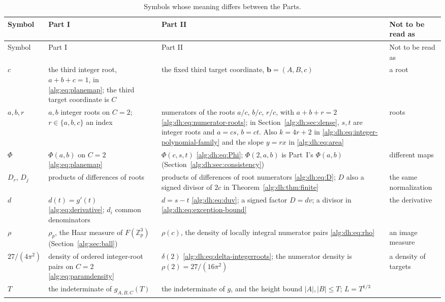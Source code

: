 \documentclass[11pt]{article}
\numberwithin{equation}{section}
\theoremstyle{plain}
\theoremstyle{plain}
\theoremstyle{plain}
\theoremstyle{definition}
\theoremstyle{definition}
\theoremstyle{definition}
\theoremstyle{remark}
\newcommand{\Z}{\mathbb Z}\newcommand{\Q}{\mathbb Q}
\newcommand{\target}{\boldsymbol b}
\begin{document}
\begingroup\small
\setlength{\tabcolsep}{4pt}
\begin{longtable}{@{}>{\raggedright}p{}>{\raggedright}p{}>{\raggedright}p{}>{\raggedright\arraybackslash}p{}@{}}
\caption{Symbols whose meaning differs between the Parts.}
\label{alg:dh:tab:notation}\\
\toprule
Symbol & Part I & Part II & Not to be read as\\
\midrule
\endfirsthead
\toprule
Symbol & Part I & Part II & Not to be read as\\
\midrule
\endhead
\bottomrule
\endfoot
$c$ & the third integer root, $a+b+c=1$, in \eqref{alg:eq:planemap}; the
third target coordinate is $C$ & the fixed third target coordinate,
$\target=(A,B,c)$ & a root\\
$a,b,r$ & $a,b$ integer roots on $C=2$; $r\in\{a,b,c\}$ an index &
numerators of the roots $a/c$, $b/c$, $r/c$, with $a+b+r=2$
\eqref{alg:dh:eq:numerator-roots}; in Section~\ref{alg:dh:sec:dense},
$s,t$ are integer roots and $a=cs$, $b=ct$. Also $k=4r+2$ in
\eqref{alg:dh:eq:integer-polynomial-family} and the slope $y=rx$ in
\eqref{alg:dh:eq:area} & roots\\
$\Phi$ & $\Phi(a,b)$ on $C=2$ \eqref{alg:eq:planemap} & $\Phi(c,s,t)$
\eqref{alg:dh:eq:Phi}; $\Phi(2,a,b)$ is Part~I's $\Phi(a,b)$
(Section~\ref{alg:dh:sec:consistency}) & different maps\\
$D_r$, $D_j$ & products of differences of roots & products of differences
of root numerators \eqref{alg:dh:eq:D}; $D$ also a signed divisor of $2c$
in Theorem~\ref{alg:dh:thm:finite} & the same normalization\\
$d$ & $d(t)=g'(t)$ \eqref{alg:eq:derivative}; $d_i$ common denominators
& $d=s-t$ \eqref{alg:dh:eq:duv}; a signed factor $D=dv$; a divisor in
\eqref{alg:dh:eq:exception-bound} & the derivative\\
$\rho$ & $\rho_p$, the Haar measure of $F(\Z_p^3)$
(Section~\ref{alg:sec:ball}) & $\rho(c)$, the density of locally
integral numerator pairs \eqref{alg:dh:eq:rho} & an image measure\\
$27/(4\pi^2)$ & density of ordered integer-root pairs on $C=2$
\eqref{alg:eq:paramdensity} & $\delta(2)$
\eqref{alg:dh:eq:delta-integerroots}; the numerator density is
$\rho(2)=27/(16\pi^2)$ & a density of targets\\
$T$ & the indeterminate of $g_{A,B,C}(T)$ & the indeterminate of $g$, and
the height bound $|A|,|B|\le T$; $L=T^{1/3}$ & \\

\end{longtable}
\end{document}
